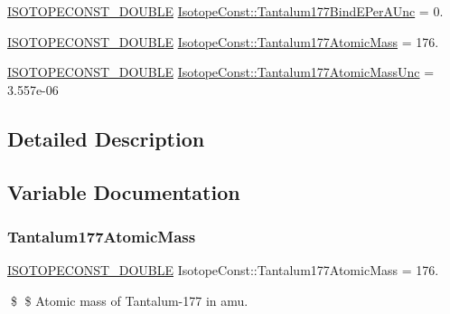 \begin{DoxyCompactItemize}
\mbox{\hyperlink{group___isotope_const-_macros_ga8f45a7272ce02c0b4c65c44636ed719a}{I\+S\+O\+T\+O\+P\+E\+C\+O\+N\+S\+T\+\_\+\+D\+O\+U\+B\+LE}} \mbox{\hyperlink{group___isotope_const-_tantalum-_ta177_gae0f62a20d10ad4461c7bb3fa9a613948}{Isotope\+Const\+::\+Tantalum177\+Bind\+E\+Per\+A\+Unc}} = 0.
\item 
\mbox{\hyperlink{group___isotope_const-_macros_ga8f45a7272ce02c0b4c65c44636ed719a}{I\+S\+O\+T\+O\+P\+E\+C\+O\+N\+S\+T\+\_\+\+D\+O\+U\+B\+LE}} \mbox{\hyperlink{group___isotope_const-_tantalum-_ta177_gaa1a15bcdfca44875cf896907d5718a5e}{Isotope\+Const\+::\+Tantalum177\+Atomic\+Mass}} = 176.
\item 
\mbox{\hyperlink{group___isotope_const-_macros_ga8f45a7272ce02c0b4c65c44636ed719a}{I\+S\+O\+T\+O\+P\+E\+C\+O\+N\+S\+T\+\_\+\+D\+O\+U\+B\+LE}} \mbox{\hyperlink{group___isotope_const-_tantalum-_ta177_ga73865bbc2cf8e82d249047ed660c5f39}{Isotope\+Const\+::\+Tantalum177\+Atomic\+Mass\+Unc}} = 3.\+557e-\/06
\end{DoxyCompactItemize}


\subsection{Detailed Description}


\subsection{Variable Documentation}
\mbox{\label{group___isotope_const-_tantalum-_ta177_gaa1a15bcdfca44875cf896907d5718a5e}} 
\subsubsection{\texorpdfstring{Tantalum177\+Atomic\+Mass}{Tantalum177AtomicMass}}
{\footnotesize\ttfamily \mbox{\hyperlink{group___isotope_const-_macros_ga8f45a7272ce02c0b4c65c44636ed719a}{I\+S\+O\+T\+O\+P\+E\+C\+O\+N\+S\+T\+\_\+\+D\+O\+U\+B\+LE}} Isotope\+Const\+::\+Tantalum177\+Atomic\+Mass = 176.}

\$ \$ Atomic mass of Tantalum-\/177 in amu. \mbox{\label{group___isotope_const-_tantalum-_ta177_ga73865bbc2cf8e82d249047ed660c5f39}} 
